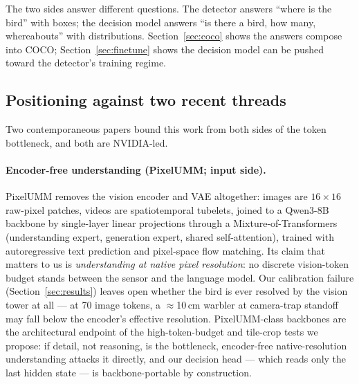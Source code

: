\documentclass[11pt]{article}
\begin{document}
The two sides answer different questions. The detector answers ``where is the
bird'' with boxes; the decision model answers ``is there a bird, how many,
whereabouts'' with distributions. Section~\ref{sec:coco} shows the answers
compose into COCO; Section~\ref{sec:finetune} shows the decision model can be
pushed toward the detector's training regime.

\subsection{Positioning against two recent threads}
\label{sec:threads}

Two contemporaneous papers bound this work from both sides of the token
bottleneck, and both are NVIDIA-led.

\paragraph{Encoder-free understanding (PixelUMM; input side).}
PixelUMM \cite{pixelumm2026} removes the vision encoder and VAE altogether:
images are $16\times16$ raw-pixel patches, videos are spatiotemporal tubelets,
joined to a Qwen3-8B backbone by single-layer linear projections through a
Mixture-of-Transformers (understanding expert, generation expert, shared
self-attention), trained with autoregressive text prediction and pixel-space
flow matching. Its claim that matters to us is \emph{understanding at native
pixel resolution}: no discrete vision-token budget stands between the sensor
and the language model. Our calibration failure
(Section~\ref{sec:results}) leaves open whether the bird is ever resolved by
the vision tower at all --- at 70 image tokens, a $\approx$10\,cm warbler at
camera-trap standoff may fall below the encoder's effective resolution.
PixelUMM-class backbones are the architectural endpoint of the
high-token-budget and tile-crop tests we propose: if detail, not reasoning,
is the bottleneck, encoder-free native-resolution understanding attacks it
directly, and our decision head --- which reads only the last hidden state
--- is backbone-portable by construction.
\end{document}
